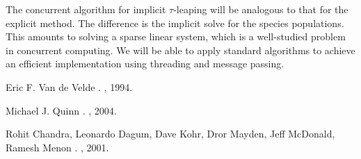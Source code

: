\documentclass{article}
\begin{document}
The concurrent algorithm for implicit $\tau$-leaping will be analogous
to that for the explicit method.  The difference is the implicit 
solve for the species populations.  This amounts to solving a sparse 
linear system, which is a well-studied problem in concurrent computing.
We will be able to apply standard algorithms 
\cite{vandevelde}
\cite{quinn}
to achieve an efficient 
implementation using threading and message passing.  


\begin{thebibliography}{10}

Eric F. Van de Velde
. 
, 1994.

Michael J. Quinn
. 
, 2004.

Rohit Chandra, Leonardo Dagum, Dave Kohr, Dror Mayden, Jeff McDonald, Ramesh Menon
. 
, 2001.

\end{thebibliography}
\end{document}
